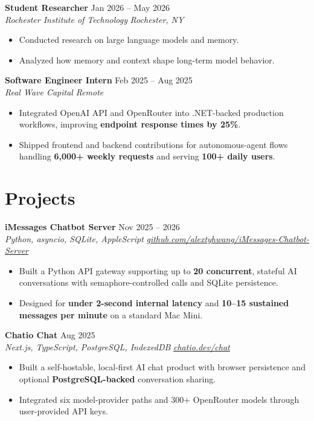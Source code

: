 \documentclass[10pt,letterpaper]{article}
\newif\ifresumeFirstRole
\newcommand{\resumeRole}[4]{%
  \ifresumeFirstRole
    \global\resumeFirstRolefalse
  \else
    \vspace{0pt plus 1fill}%
  \fi
  \textbf{#1} \hfill #2\\
  \textit{#3} \hfill \textit{#4}
}
\begin{document}
\resumeRole{Student Researcher}{Jan 2026 -- May 2026}{Rochester Institute of Technology}{Rochester, NY}
\begin{itemize}
  \item Conducted research on large language models and memory.
  \item Analyzed how memory and context shape long-term model behavior.
\end{itemize}

\resumeRole{Software Engineer Intern}{Feb 2025 -- Aug 2025}{Real Wave Capital}{Remote}
\begin{itemize}
  \item Integrated OpenAI API and OpenRouter into .NET-backed production workflows, improving \textbf{endpoint response times by 25\%}.
  \item Shipped frontend and backend contributions for autonomous-agent flows handling \textbf{6,000+ weekly requests} and serving \textbf{100+ daily users}.
\end{itemize}

\section*{Projects}
\resumeRole{iMessages Chatbot Server}{Nov 2025 -- 2026}{Python, asyncio, SQLite, AppleScript}{\href{https://github.com/alextyhwang/iMessages-Chatbot-Server}{github.com/alextyhwang/iMessages-Chatbot-Server}}
\begin{itemize}
  \item Built a Python API gateway supporting up to \textbf{20 concurrent}, stateful AI conversations with semaphore-controlled calls and SQLite persistence.
  \item Designed for \textbf{under 2-second internal latency} and \textbf{10--15 sustained messages per minute} on a standard Mac Mini.
\end{itemize}

\resumeRole{Chatio Chat}{Aug 2025}{Next.js, TypeScript, PostgreSQL, IndexedDB}{\href{https://chatio.dev/chat}{chatio.dev/chat}}
\begin{itemize}
  \item Built a self-hostable, local-first AI chat product with browser persistence and optional \textbf{PostgreSQL-backed} conversation sharing.
  \item Integrated six model-provider paths and 300+ OpenRouter models through user-provided API keys.
\end{itemize}
\end{document}
